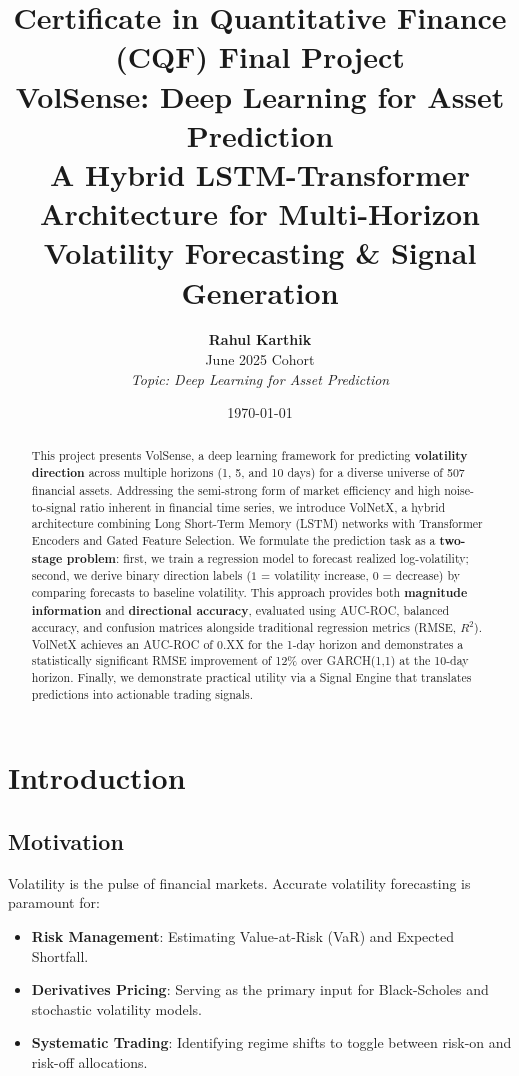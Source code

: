 \documentclass[11pt, a4paper]{article}
\title{\textbf{Certificate in Quantitative Finance (CQF) Final Project} \\
\vspace{0.5cm}
\Large \textbf{VolSense: Deep Learning for Asset Prediction} \\
\large A Hybrid LSTM-Transformer Architecture for Multi-Horizon Volatility Forecasting \& Signal Generation}
\author{
    \textbf{Rahul Karthik} \\
    June 2025 Cohort \\
    \textit{Topic: Deep Learning for Asset Prediction}
}
\date{\today}
\begin{document}
\maketitle

\begin{abstract}
\noindent
This project presents VolSense, a deep learning framework for predicting 
\textbf{volatility direction} across multiple horizons (1, 5, and 10 days) 
for a diverse universe of 507 financial assets. Addressing the semi-strong 
form of market efficiency and high noise-to-signal ratio inherent in 
financial time series, we introduce VolNetX, a hybrid architecture combining 
Long Short-Term Memory (LSTM) networks with Transformer Encoders and 
Gated Feature Selection.
We formulate the prediction task as a \textbf{two-stage problem}: first, we 
train a regression model to forecast realized log-volatility; second, we 
derive binary direction labels ($1$ = volatility increase, $0$ = decrease) 
by comparing forecasts to baseline volatility. This approach provides both 
\textbf{magnitude information} and \textbf{directional accuracy}, evaluated 
using AUC-ROC, balanced accuracy, and confusion matrices alongside 
traditional regression metrics (RMSE, $R^2$).
VolNetX achieves an AUC-ROC of 0.XX for the 1-day horizon and demonstrates 
a statistically significant RMSE improvement of 12\% over GARCH(1,1) at the 
10-day horizon. Finally, we demonstrate practical utility via a 
Signal Engine that translates predictions into actionable trading signals.
\end{abstract}

\newpage
\tableofcontents
\newpage

\section{Introduction}
\subsection{Motivation}
Volatility is the pulse of financial markets. Accurate volatility forecasting is paramount for:
\begin{itemize}
    \item \textbf{Risk Management}: Estimating Value-at-Risk (VaR) and Expected Shortfall.
    \item \textbf{Derivatives Pricing}: Serving as the primary input for Black-Scholes and stochastic volatility models.
    \item \textbf{Systematic Trading}: Identifying regime shifts to toggle between risk-on and risk-off allocations.
\end{itemize}
\end{document}
